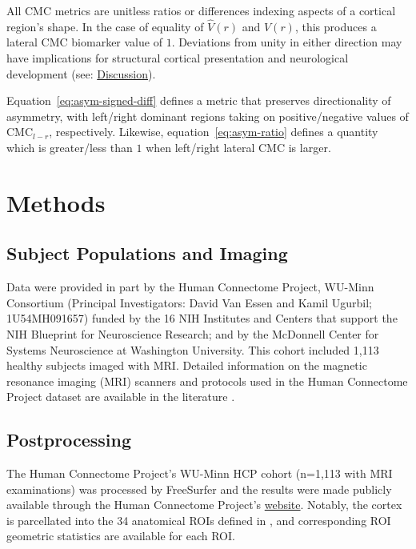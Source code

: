 \documentclass{article}
\begin{document}
%
%

All CMC metrics are unitless ratios or differences indexing aspects of a
cortical region's shape. In the case of equality of \(\hat{V}(r)\) and
\(V(r)\), this produces a lateral CMC biomarker value of \(1\). Deviations
from unity in either direction may have implications for structural cortical
presentation and neurological development (see:
\hyperref[sec:discussion]{Discussion}).

Equation~\ref{eq:asym-signed-diff} defines a metric that preserves
directionality of asymmetry, with left/right dominant regions taking on
positive/negative values of \(\text{CMC}_{l - r}\), respectively. Likewise,
equation~\ref{eq:asym-ratio} defines a quantity which is greater/less than
\(1\) when left/right lateral \(\text{CMC}\) is larger.

\section{Methods}
\label{sec:methods}
\subsection{Subject Populations and Imaging}
\label{sec:population}

Data were provided in part by the Human Connectome Project, WU-Minn
Consortium (Principal Investigators: David Van Essen and Kamil Ugurbil;
1U54MH091657) funded by the 16 NIH Institutes and Centers that support the
NIH Blueprint for Neuroscience Research; and by the McDonnell Center for
Systems Neuroscience at Washington University. This cohort included 1,113
healthy subjects imaged with MRI\@. Detailed information on the magnetic
resonance imaging (MRI) scanners and protocols used in the Human Connectome
Project dataset are available in the literature
\citep{elamHumanConnectomeProject2021}.

\subsection{Postprocessing}
\label{sec:postprocessing}

The Human Connectome Project's WU-Minn HCP cohort (n=1,113 with MRI
examinations) was processed by FreeSurfer \citep{fischlFreeSurfer2012} and
the results were made publicly available through the Human Connectome
Project's \href{%
https://www.humanconnectome.org/study/hcp-young-adult/document/1200-subjects-data-release}{website}.
Notably, the cortex is parcellated into the 34 anatomical ROIs defined in
\citet{desikanAutomatedLabelingSystem2006}, and corresponding ROI geometric
statistics are available for each ROI.
\end{document}
